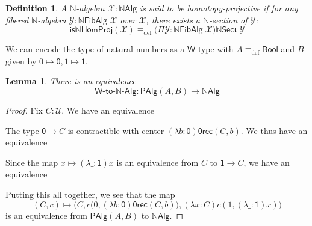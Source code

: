 \documentclass[10pt,a4paper,oneside,reqno]{amsart}
\numberwithin{equation}{section}
\theoremstyle{mythm}
\newtheorem{lemma}[theorem]{Lemma}
\theoremstyle{mydef}
\newtheorem{definition}[theorem]{Definition}
\theoremstyle{myrmk}
\newcommand{\deq}{\equiv}
\newcommand{\defeq}{\deq_{\mathrm{def}}}
\newcommand{\U}{\mathcal{U}}
\newcommand{\prd}[1]{\Pi_{#1}}
\newcommand{\abort}{\mathsf{0rec}}
\newcommand{\nat}{\ensuremath{\mathbb{N}}}
\newcommand{\W}{\mathsf{W}}
\newcommand{\Bool}{\mathsf{Bool}}
\newcommand{\one}{\mathsf{1}}
\newcommand{\zero}{\mathsf{0}}
\newcommand{\NatAlg}{\nat\mathsf{Alg}}
\newcommand{\NatFibAlg}{\nat\mathsf{FibAlg}}
\newcommand{\NatFibHom}{\nat\mathsf{Sect}}
\newcommand{\IsNatHProj}{\mathsf{is}\nat\mathsf{HomProj}}
\newcommand{\WAlgToNatAlg}{\W\text{-}\mathsf{to}\text{-}\nat\text{-}\mathsf{Alg}}
\newcommand{\WAlg}{\mathsf{PAlg}}
\newcommand{\X}{\mathcal{X}}
\newcommand{\Y}{\mathcal{Y}}
\begin{document}
\begin{definition}\label{def:NatHProj}
A $\nat$-algebra $\X : \NatAlg$ is said to be \emph{homotopy-projective} if for any fibered $\nat$-algebra $\Y : \NatFibAlg \; \X$ over $\X$, there exists a $\nat$-section of $\Y$:
\[ \IsNatHProj(\X) \defeq \big(\Pi \Y:\NatFibAlg \; \X\big) \NatFibHom \; \Y \]  
\end{definition}

We can encode the type of natural numbers as a $\W$-type with $A \defeq \Bool$ and $B$ given by $0 \mapsto \zero, 1 \mapsto \one$. 
\begin{lemma}
There is an equivalence
\[ \WAlgToNatAlg : \WAlg(A,B) \to \NatAlg \]
\end{lemma}
\begin{proof}
Fix $C : \U$. We have an equivalence
\begin{center}
\end{center}
The type $\zero \to C$ is contractible with center $(\lambda b:\zero) \abort(C,b)$. We thus have an equivalence
\begin{center}
\end{center}
Since the map $x \mapsto (\lambda \_:\one)x$ is an equivalence from $C$ to $\one \to C$, we have an equivalence
\begin{center}
\end{center}
Putting this all together, we see that the map 
\[ (C,c) \mapsto \Big(C,c\big(0,(\lambda b:\zero) \abort(C,b)\big),(\lambda x:C) c(1, (\lambda \_:\one)x)\Big)\] 
is an equivalence from $\WAlg(A,B)$ to $\NatAlg$.
\end{proof}
\end{document}
